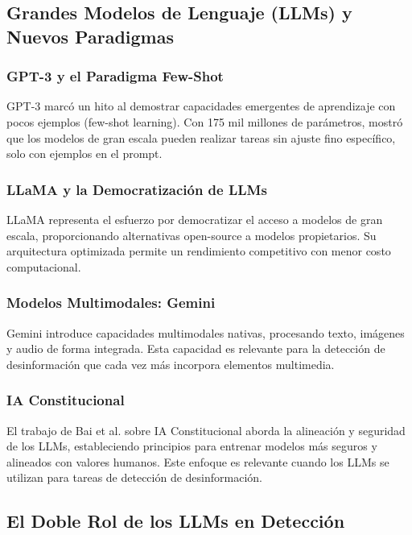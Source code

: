 \subsection{Grandes Modelos de Lenguaje (LLMs) y Nuevos Paradigmas}

\subsubsection{GPT-3 y el Paradigma Few-Shot}

GPT-3 \cite{brown2020language} marcó un hito al demostrar capacidades emergentes de aprendizaje con pocos ejemplos (few-shot learning). Con 175 mil millones de parámetros, mostró que los modelos de gran escala pueden realizar tareas sin ajuste fino específico, solo con ejemplos en el prompt.

\subsubsection{LLaMA y la Democratización de LLMs}

LLaMA \cite{touvron2023llama} representa el esfuerzo por democratizar el acceso a modelos de gran escala, proporcionando alternativas open-source a modelos propietarios. Su arquitectura optimizada permite un rendimiento competitivo con menor costo computacional.

\subsubsection{Modelos Multimodales: Gemini}

Gemini \cite{gemini2023family} introduce capacidades multimodales nativas, procesando texto, imágenes y audio de forma integrada. Esta capacidad es relevante para la detección de desinformación que cada vez más incorpora elementos multimedia.

\subsubsection{IA Constitucional}

El trabajo de Bai et al. \cite{bai2022constitutional} sobre IA Constitucional aborda la alineación y seguridad de los LLMs, estableciendo principios para entrenar modelos más seguros y alineados con valores humanos. Este enfoque es relevante cuando los LLMs se utilizan para tareas de detección de desinformación.

\subsection{El Doble Rol de los LLMs en Detección}

